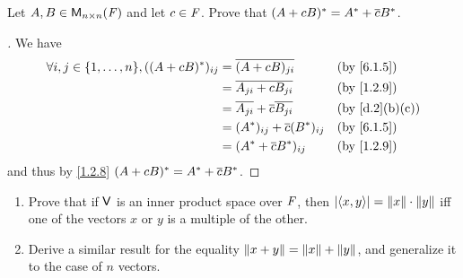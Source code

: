 \begin{ex}\label{ex:6.1.14}
  Let \(A, B \in \ms[n][n][\F]\) and let \(c \in \mathit{F}\).
  Prove that \((A + cB)^* = A^* + \overline{c} B^*\).
\end{ex}

\begin{proof}[]
  We have
  \begin{align*}
    \forall i, j \in \set{1, \dots, n}, ((A + cB)^*)_{i j} & = \conj{(A + cB)_{j i}}                    &  & \by{6.1.5}    \\
                                                           & = \conj{A_{j i} + c B_{j i}}               &  & \by{1.2.9}    \\
                                                           & = \conj{A_{j i}} + \conj{c} \conj{B_{j i}} &  & \by{d.2}[b,c] \\
                                                           & = (A^*)_{i j} + \conj{c} (B^*)_{i j}       &  & \by{6.1.5}    \\
                                                           & = (A^* + \conj{c} B^*)_{i j}               &  & \by{1.2.9}
  \end{align*}
  and thus by \cref{1.2.8} \((A + cB)^* = A^* + \overline{c} B^*\).
\end{proof}

\begin{ex}\label{ex:6.1.15}
  \begin{enumerate}
    \item Prove that if \(\mathsf{V}\) is an inner product space over \(\mathit{F}\), then \(\left\lvert\left\langle x, y\right\rangle\right\rvert = \left\lVert x\right\rVert \cdot \left\lVert y\right\rVert\) iff one of the vectors \(x\) or \(y\) is a multiple of the other.
    \item Derive a similar result for the equality \(\left\lVert x + y\right\rVert = \left\lVert x\right\rVert + \left\lVert y\right\rVert\), and generalize it to the case of \(n\) vectors.
  \end{enumerate}
\end{ex}

